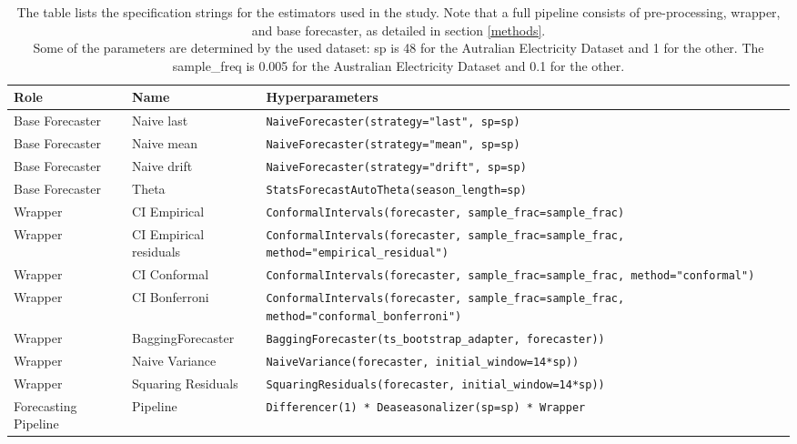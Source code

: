 \begin{table}[]
    \centering    \caption{
    The table lists the specification strings for the estimators used in the study. Note that a full pipeline consists of pre-processing, wrapper, and base forecaster, as detailed in section \ref{methods}. \\
    Some of the parameters are determined by the used dataset: sp is 48 for the Autralian Electricity Dataset and 1 for the other. The sample\_freq is 0.005 for the Australian Electricity Dataset and 0.1 for the other.\\}
    \label{tab:hyperparams}
    \footnotesize
    \begin{tabular}{p{2.5cm}p{4cm}|p{7.5cm}}
    \toprule  
         Role & Name &  Hyperparameters \\ \midrule
         Base Forecaster & Naive last &  \texttt{NaiveForecaster(strategy="last", sp=sp)}\\
         Base Forecaster &  Naive mean &  \texttt{NaiveForecaster(strategy="mean", sp=sp)}\\
         Base Forecaster & Naive drift &  \texttt{NaiveForecaster(strategy="drift", sp=sp)}\\ 
         Base Forecaster & Theta &   \texttt{StatsForecastAutoTheta(season\_length=sp)} \\ \midrule
         Wrapper & CI Empirical & \texttt{ConformalIntervals(forecaster, sample\_frac=sample\_frac)} \\
         Wrapper & CI Empirical residuals & \texttt{ConformalIntervals(forecaster, sample\_frac=sample\_frac, method="empirical\_residual")} \\
         Wrapper & CI Conformal & \texttt{ConformalIntervals(forecaster, sample\_frac=sample\_frac, method="conformal")} \\
         Wrapper & CI Bonferroni & \texttt{ConformalIntervals(forecaster, sample\_frac=sample\_frac, method="conformal\_bonferroni")} \\
         Wrapper & BaggingForecaster & \texttt{BaggingForecaster(ts\_bootstrap\_adapter, forecaster))} \\
         Wrapper & Naive Variance & \texttt{NaiveVariance(forecaster, initial\_window=14*sp))}\\
         Wrapper & Squaring Residuals & \texttt{SquaringResiduals(forecaster, initial\_window=14*sp))}  \\ \midrule
         Forecasting Pipeline & Pipeline & \texttt{Differencer(1) * Deaseasonalizer(sp=sp) * Wrapper} \\ \midrule
        

\end{tabular}
\end{table}
